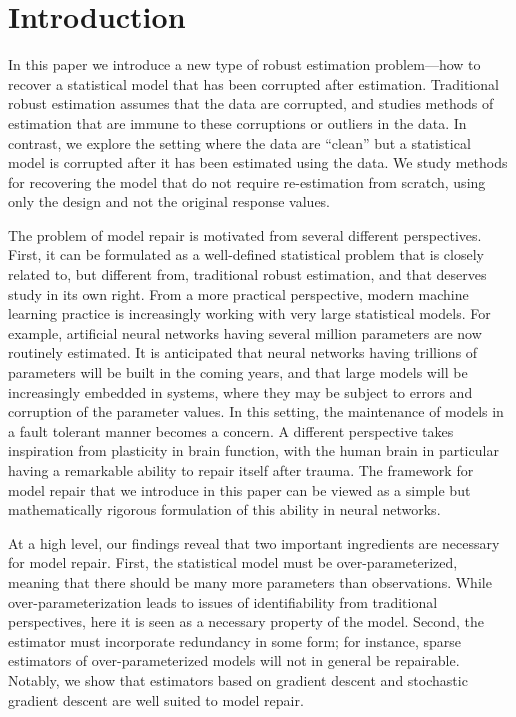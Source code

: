 
\section{Introduction}
\label{sec:intro}

In this paper we introduce a new type of robust estimation problem---how to recover a statistical
model that has been corrupted after estimation. Traditional robust estimation assumes that the data are corrupted, and studies methods of estimation that are immune to these corruptions or outliers in the data.
In contrast, we explore the setting where the data are ``clean'' but a statistical model is corrupted after it has been estimated using the data. We study methods for recovering the model that do not require re-estimation from scratch, using only the design and not the original response values.

The problem of model repair is motivated from several different perspectives. First, it can be formulated as a well-defined statistical problem that is closely related to, but different from, traditional robust estimation, and that deserves study in its own right. From a more practical perspective, modern machine learning practice is increasingly working with very large statistical models. For example, artificial neural networks having several million parameters are now routinely estimated. It is anticipated that neural networks having trillions of parameters will be built in the coming years, and that large models will be increasingly embedded in systems, where they may be subject to errors and corruption of the parameter values. In this setting, the maintenance of models in a fault tolerant manner becomes a concern.  A different perspective takes inspiration from plasticity in brain function, with the human brain in particular having a remarkable ability to repair itself after trauma. The framework for model repair that we introduce in this paper can be viewed as a simple but mathematically rigorous formulation of this ability in neural networks.

At a high level, our findings reveal that two important ingredients are necessary for model repair. First, the statistical model must be over-parameterized, meaning that there should be many more parameters than observations.
While over-parameterization leads to issues of identifiability from traditional perspectives, here it is seen as a necessary property of the model. Second, the estimator must incorporate redundancy in some form; for instance, sparse estimators of over-parameterized models will not in general be repairable. Notably, we show that estimators based on gradient descent and stochastic gradient descent are well suited to model repair.

